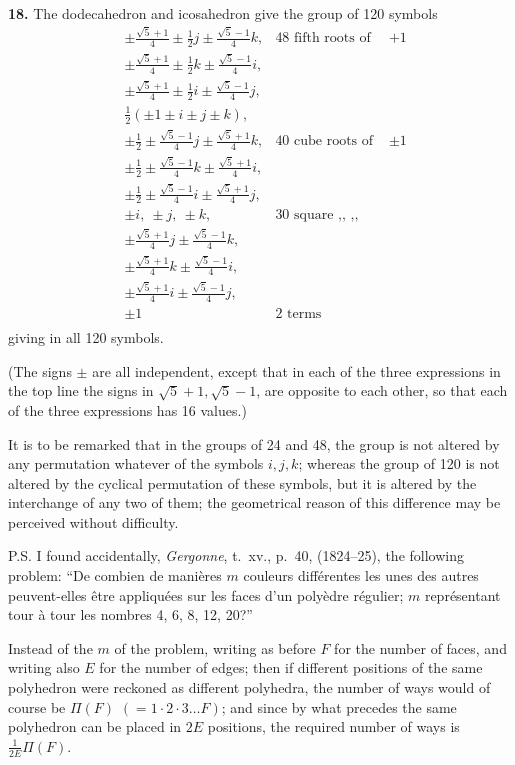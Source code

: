 \documentclass[11pt]{article}
\begin{document}
\textbf{18.} The dodecahedron and icosahedron give the group of 120 symbols
\begin{align*}
&\pm\tfrac{\sqrt{5}+1}{4} \pm \tfrac{1}{2}j \pm \tfrac{\sqrt{5}-1}{4}k, & \text{48 fifth roots of } &+ 1\\
&\pm\tfrac{\sqrt{5}+1}{4} \pm \tfrac{1}{2}k \pm \tfrac{\sqrt{5}-1}{4}i, & &\\
&\pm\tfrac{\sqrt{5}+1}{4} \pm \tfrac{1}{2}i \pm \tfrac{\sqrt{5}-1}{4}j, & &\\
&\tfrac{1}{2}(\pm 1 \pm i \pm j \pm k), & &\\
&\pm\tfrac{1}{2} \pm \tfrac{\sqrt{5}-1}{4}j \pm \tfrac{\sqrt{5}+1}{4}k, & \text{40 cube roots of } &\pm 1\\
&\pm\tfrac{1}{2} \pm \tfrac{\sqrt{5}-1}{4}k \pm \tfrac{\sqrt{5}+1}{4}i, & &\\
&\pm\tfrac{1}{2} \pm \tfrac{\sqrt{5}-1}{4}i \pm \tfrac{\sqrt{5}+1}{4}j, & &\\
&\pm i,\ \pm j,\ \pm k, & \text{30 square ,, ,,} &\\
&\pm\tfrac{\sqrt{5}+1}{4}j \pm \tfrac{\sqrt{5}-1}{4}k, & &\\
&\pm\tfrac{\sqrt{5}+1}{4}k \pm \tfrac{\sqrt{5}-1}{4}i, & &\\
&\pm\tfrac{\sqrt{5}+1}{4}i \pm \tfrac{\sqrt{5}-1}{4}j, & &\\
&\pm 1 & \text{2 terms} & \\
\end{align*}
\noindent giving in all 120 symbols.

(The signs $\pm$ are all independent, except that in each of the three expressions in the top line the signs in $\sqrt{5}+1, \sqrt{5}-1$, are opposite to each other, so that each of the three expressions has 16 values.)

It is to be remarked that in the groups of 24 and 48, the group is not altered by any permutation whatever of the symbols $i, j, k$; whereas the group of 120 is not altered by the cyclical permutation of these symbols, but it is altered by the interchange of any two of them; the geometrical reason of this difference may be perceived without difficulty.

P.S. I found accidentally, \emph{Gergonne}, t.~xv., p.~40, (1824--25), the following problem: ``De combien de mani\`eres $m$ couleurs diff\'erentes les unes des autres peuvent-elles \^etre appliqu\'ees sur les faces d'un poly\`edre r\'egulier; $m$ repr\'esentant tour \`a tour les nombres 4, 6, 8, 12, 20?''

Instead of the $m$ of the problem, writing as before $F$ for the number of faces, and writing also $E$ for the number of edges; then if different positions of the same polyhedron were reckoned as different polyhedra, the number of ways would of course be $\Pi(F)$ $(= 1 \cdot 2 \cdot 3 \ldots F)$; and since by what precedes the same polyhedron can be placed in $2E$ positions, the required number of ways is $\tfrac{1}{2E}\Pi(F)$.
\end{document}
